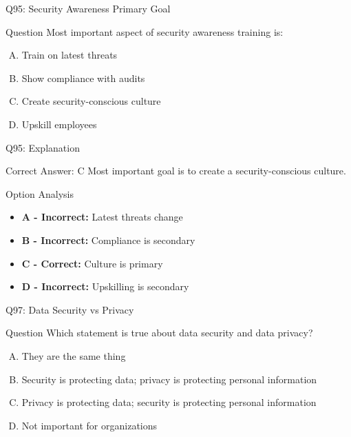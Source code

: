 \documentclass{beamer}
\begin{document}
	\begin{frame}{Q95: Security Awareness Primary Goal}
		\begin{block}{Question}
			Most important aspect of security awareness training is:
		\end{block}
		\begin{enumerate}[(A)]
			\item Train on latest threats
			\item Show compliance with audits
			\item Create security-conscious culture
			\item Upskill employees
		\end{enumerate}
	\end{frame}
	
	\begin{frame}{Q95: Explanation}
		\begin{block}{Correct Answer: C}
			Most important goal is to create a security-conscious culture.
		\end{block}
		\begin{block}{Option Analysis}
			\begin{itemize}
				\item \textbf{A - Incorrect:} Latest threats change
				\item \textbf{B - Incorrect:} Compliance is secondary
				\item \textbf{C - Correct:} Culture is primary
				\item \textbf{D - Incorrect:} Upskilling is secondary
			\end{itemize}
		\end{block}
	\end{frame}

	\begin{frame}{Q97: Data Security vs Privacy}
		\begin{block}{Question}
			Which statement is true about data security and data privacy?
		\end{block}
		\begin{enumerate}[(A)]
			\item They are the same thing
			\item Security is protecting data; privacy is protecting personal information
			\item Privacy is protecting data; security is protecting personal information
			\item Not important for organizations
		\end{enumerate}
	\end{frame}
	
\end{document}

